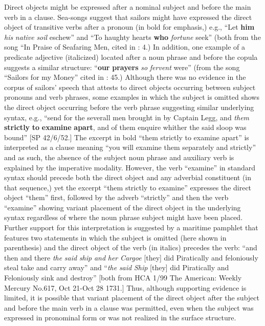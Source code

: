 Direct objects might be expressed after a nominal subject and before the main verb in a clause. Sea-songs suggest that sailors might have expressed the direct object of transitive verbs after a pronoun (in bold for emphasis,) e.g., “Let \textbf{him} \textit{his} \textit{native} \textit{soil} eschew” and “To haughty hearts \textbf{who} \textit{fortune} seek” (both from the song “In Praise of Seafaring Men, cited in \citealt{Palmer1986}: 4.) In addition, one example of a predicate adjective (italicized) located after a noun phrase and before the copula suggests a similar structure: “\textbf{our} \textbf{prayers} \textit{so} \textit{fervent} were” (from the song “Sailors for my Money” cited in \citealt{Palmer1986}: 45.) Although there was no evidence in the corpus of sailors’ speech that attests to direct objects occurring between subject pronouns and verb phrases, some examples in which the subject is omitted shows the direct object occurring before the verb phrase suggesting similar underlying syntax, e.g., “send for the severall men brought in by Captain Legg, and \textit{them} \textbf{strictly} \textbf{to} \textbf{examine} \textbf{apart}, and of them enquire whither the said sloop was bound” [SP 42/6/52.] The excerpt in bold “them strictly to examine apart” is interpreted as a clause meaning “you will examine them separately and strictly” and as such, the absence of the subject noun phrase and auxiliary verb is explained by the imperative modality. However, the verb “examine” in standard syntax should precede both the direct object and any adverbial constituent (in that sequence,) yet the excerpt “them strictly to examine” expresses the direct object “them” first, followed by the adverb “strictly” and then the verb “examine” showing variant placement of the direct object in the underlying syntax regardless of where the noun phrase subject might have been placed. Further support for this interpretation is suggested by a maritime pamphlet that features two statements in which the subject is omitted (here shown in parenthesis) and the direct object of the verb (in italics) precedes the verb: “and then and there \textit{the} \textit{said} \textit{ship} \textit{and} \textit{her} \textit{Cargoe} [they] did Piratically and feloniously steal take and carry away” and “\textit{the} \textit{said} \textit{Ship} [they] did Piratically and Feloniously sink and destroy” [both from HCA 1/99 The American: Weekly Mercury No.617, Oct 21-Oct 28 1731.] Thus, although supporting evidence is limited, it is possible that variant placement of the direct object after the subject and before the main verb in a clause was permitted, even when the subject was expressed in pronominal form or was not realized in the surface structure. 

